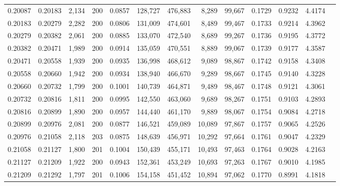 \begin{tabular}{rrrrrrrrrrrrr}
0.20087 & 0.20183 & 2,134 & 200 &                                     0.0857 & 128,727 & 476,883 &   8,289 &  99,667 & 0.1729 & 0.9232 & 4.4174 \\
0.20183 & 0.20279 & 2,282 & 200 &                                     0.0806 & 131,009 & 474,601 &   8,489 &  99,467 & 0.1733 & 0.9214 & 4.3962 \\
0.20279 & 0.20382 & 2,061 & 200 &                                     0.0885 & 133,070 & 472,540 &   8,689 &  99,267 & 0.1736 & 0.9195 & 4.3772 \\
0.20382 & 0.20471 & 1,989 & 200 &                                     0.0914 & 135,059 & 470,551 &   8,889 &  99,067 & 0.1739 & 0.9177 & 4.3587 \\
0.20471 & 0.20558 & 1,939 & 200 &                                     0.0935 & 136,998 & 468,612 &   9,089 &  98,867 & 0.1742 & 0.9158 & 4.3408 \\
0.20558 & 0.20660 & 1,942 & 200 &                                     0.0934 & 138,940 & 466,670 &   9,289 &  98,667 & 0.1745 & 0.9140 & 4.3228 \\
0.20660 & 0.20732 & 1,799 & 200 &                                     0.1001 & 140,739 & 464,871 &   9,489 &  98,467 & 0.1748 & 0.9121 & 4.3061 \\
0.20732 & 0.20816 & 1,811 & 200 &                                     0.0995 & 142,550 & 463,060 &   9,689 &  98,267 & 0.1751 & 0.9103 & 4.2893 \\
0.20816 & 0.20899 & 1,890 & 200 &                                     0.0957 & 144,440 & 461,170 &   9,889 &  98,067 & 0.1754 & 0.9084 & 4.2718 \\
0.20899 & 0.20976 & 2,081 & 200 &                                     0.0877 & 146,521 & 459,089 &  10,089 &  97,867 & 0.1757 & 0.9065 & 4.2526 \\
0.20976 & 0.21058 & 2,118 & 203 &                                     0.0875 & 148,639 & 456,971 &  10,292 &  97,664 & 0.1761 & 0.9047 & 4.2329 \\
0.21058 & 0.21127 & 1,800 & 201 &                                     0.1004 & 150,439 & 455,171 &  10,493 &  97,463 & 0.1764 & 0.9028 & 4.2163 \\
0.21127 & 0.21209 & 1,922 & 200 &                                     0.0943 & 152,361 & 453,249 &  10,693 &  97,263 & 0.1767 & 0.9010 & 4.1985 \\
0.21209 & 0.21292 & 1,797 & 201 &                                     0.1006 & 154,158 & 451,452 &  10,894 &  97,062 & 0.1770 & 0.8991 & 4.1818 \\

\end{tabular}
